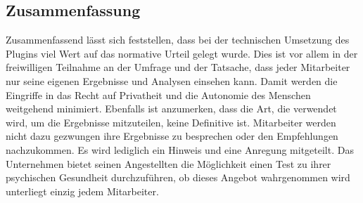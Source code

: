 \documentclass[a4paper,12pt,]{article}
\begin{document}
\subsection{Zusammenfassung}
Zusammenfassend lässt sich feststellen, dass bei der technischen Umsetzung des Plugins viel Wert auf das normative Urteil gelegt wurde. Dies ist vor allem in der freiwilligen Teilnahme an der Umfrage und der Tatsache, dass jeder Mitarbeiter nur seine eigenen Ergebnisse und Analysen einsehen kann. Damit werden die Eingriffe in das Recht auf Privatheit und die Autonomie des Menschen weitgehend minimiert. Ebenfalls ist anzumerken, dass die Art, die verwendet wird, um die Ergebnisse mitzuteilen, keine Definitive ist. Mitarbeiter werden nicht dazu gezwungen ihre Ergebnisse zu besprechen oder den Empfehlungen nachzukommen. Es wird lediglich ein Hinweis und eine Anregung mitgeteilt. Das Unternehmen bietet seinen Angestellten die Möglichkeit einen Test zu ihrer psychischen Gesundheit durchzuführen, ob dieses Angebot wahrgenommen wird unterliegt einzig jedem Mitarbeiter.
\end{document}
